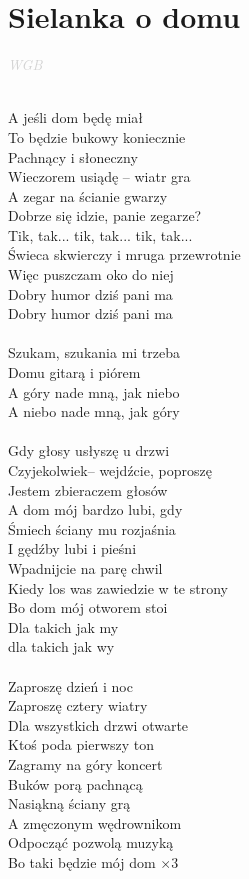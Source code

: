 \documentclass[a5paper, 10pt]{book}
\begin{document}
\section{Sielanka o domu}\textcolor{lightgray}{\textit{WGB}}\\~\\
\begin{minipage}[t]{0.65\textwidth}
A jeśli dom będę miał\\
To będzie bukowy koniecznie\\
Pachnący i słoneczny\\
Wieczorem usiądę – wiatr gra\\
A zegar na ścianie gwarzy\\
Dobrze się idzie, panie zegarze?\\
Tik, tak... tik, tak... tik, tak...\\
Świeca skwierczy i mruga przewrotnie\\
Więc puszczam oko do niej\\
Dobry humor dziś pani ma\\
Dobry humor dziś pani ma\\
\\
\hspace*{6mm}Szukam, szukania mi trzeba\\
\hspace*{6mm}Domu gitarą i piórem\\
\hspace*{6mm}A góry nade mną, jak niebo\\
\hspace*{6mm}A niebo nade mną, jak góry\\
\\
Gdy głosy usłyszę u drzwi\\
Czyjekolwiek– wejdźcie, poproszę\\
Jestem zbieraczem głosów\\
A dom mój bardzo lubi, gdy\\
Śmiech ściany mu rozjaśnia\\
I gędźby lubi i pieśni\\
Wpadnijcie na parę chwil\\
Kiedy los was zawiedzie w te strony\\
Bo dom mój otworem stoi\\
Dla takich jak my\\ dla takich jak wy\\
\\
Zaproszę dzień i noc\\
Zaproszę cztery wiatry\\
Dla wszystkich drzwi otwarte\\
Ktoś poda pierwszy ton\\
Zagramy na góry koncert\\
Buków porą pachnącą\\
Nasiąkną ściany grą\\
A zmęczonym wędrownikom\\
Odpocząć pozwolą muzyką\\
Bo taki będzie mój dom $\times 3$\\

\end{minipage}
\end{document}
